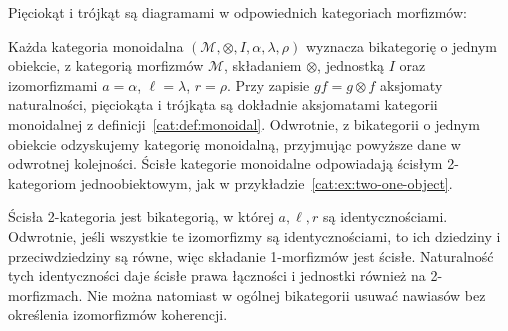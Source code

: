 Pięciokąt i trójkąt są diagramami w odpowiednich kategoriach morfizmów:
\begin{center}

\end{center}

\begin{przyklad}\label{cat:ex:one-object-bicategory}
Każda kategoria monoidalna $(\mathcal M,\otimes,I,\alpha,\lambda,\rho)$ wyznacza bikategorię o jednym obiekcie, z kategorią morfizmów $\mathcal M$, składaniem $\otimes$, jednostką $I$ oraz izomorfizmami $a=\alpha$, $\ell=\lambda$, $r=\rho$. Przy zapisie $gf=g\otimes f$ aksjomaty naturalności, pięciokąta i trójkąta są dokładnie aksjomatami kategorii monoidalnej z definicji~\ref{cat:def:monoidal}. Odwrotnie, z bikategorii o jednym obiekcie odzyskujemy kategorię monoidalną, przyjmując powyższe dane w odwrotnej kolejności. Ścisłe kategorie monoidalne odpowiadają ścisłym 2-kategoriom jednoobiektowym, jak w przykładzie~\ref{cat:ex:two-one-object}.
\end{przyklad}

\begin{uwaga}
Ścisła 2-kategoria jest bikategorią, w której $a,\ell,r$ są identycznościami. Odwrotnie, jeśli wszystkie te izomorfizmy są identycznościami, to ich dziedziny i przeciwdziedziny są równe, więc składanie 1-morfizmów jest ścisłe. Naturalność tych identyczności daje ścisłe prawa łączności i jednostki również na 2-morfizmach. Nie można natomiast w ogólnej bikategorii usuwać nawiasów bez określenia izomorfizmów koherencji.
\end{uwaga}

